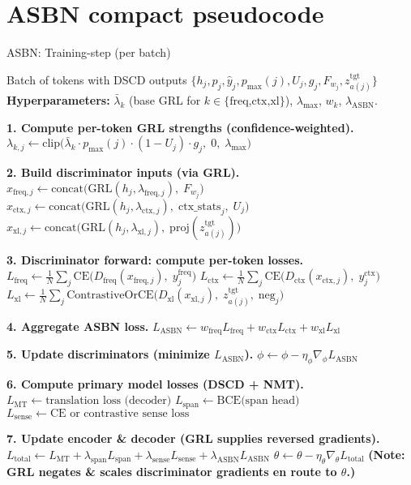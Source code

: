 \documentclass[11pt]{article}
\begin{document}
\section{ASBN compact pseudocode}
\begin{algorithm}[H]
\caption{ASBN: Training-step (per batch)}
\label{alg:asbn}
\begin{algorithmic}[1]
\Require Batch of tokens with DSCD outputs $\{ h_j, p_j, \hat{y}_j, p_{\max}(j), U_j, g_j, F_{w_j}, z^{\mathrm{tgt}}_{a(j)} \}$
\Statex \textbf{Hyperparameters:} $\bar{\lambda}_k$ (base GRL for $k\in\{\text{freq,ctx,xl}\}$), $\lambda_{\max}$, $w_k$, $\lambda_{\text{ASBN}}$.
\vspace{4pt}

\State \textbf{1. Compute per-token GRL strengths (confidence-weighted).}
    \State $\lambda_{k,j} \gets \mathrm{clip}\!\big(\bar{\lambda}_k \cdot p_{\max}(j)\cdot(1-U_j)\cdot g_j,\;0,\;\lambda_{\max}\big)$ 
\EndFor

\State \textbf{2. Build discriminator inputs (via GRL).}
    \State $x_{\text{freq},j} \gets \mathrm{concat}\big(\mathrm{GRL}(h_j,\lambda_{\text{freq},j}),\;F_{w_j}\big)$
    \State $x_{\text{ctx},j}  \gets \mathrm{concat}\big(\mathrm{GRL}(h_j,\lambda_{\text{ctx},j}),\;\text{ctx\_stats}_j,\;U_j\big)$
    \State $x_{\text{xl},j}   \gets \mathrm{concat}\big(\mathrm{GRL}(h_j,\lambda_{\text{xl},j}),\;\mathrm{proj}(z^{\mathrm{tgt}}_{a(j)})\big)$
\EndFor

\State \textbf{3. Discriminator forward: compute per-token losses.}
\State $L_{\text{freq}} \gets \frac{1}{N}\sum_j \mathrm{CE}\big(D_{\text{freq}}(x_{\text{freq},j}),\; y^{\text{freq}}_j\big)$
\State $L_{\text{ctx}}  \gets \frac{1}{N}\sum_j \mathrm{CE}\big(D_{\text{ctx}}(x_{\text{ctx},j}),\; y^{\text{ctx}}_j\big)$
\State $L_{\text{xl}}   \gets \frac{1}{N}\sum_j \mathrm{ContrastiveOrCE}\big(D_{\text{xl}}(x_{\text{xl},j}),\; z^{\mathrm{tgt}}_{a(j)},\; \text{neg}_j\big)$

\State \textbf{4. Aggregate ASBN loss.}
\State $L_{\text{ASBN}} \gets w_{\text{freq}}L_{\text{freq}} + w_{\text{ctx}}L_{\text{ctx}} + w_{\text{xl}}L_{\text{xl}}$

\State \textbf{5. Update discriminators (minimize $L_{\text{ASBN}}$).}
\State $\phi \gets \phi - \eta_\phi \nabla_\phi L_{\text{ASBN}}$

\State \textbf{6. Compute primary model losses (DSCD + NMT).}
\State $L_{\text{MT}} \gets \text{translation loss (decoder)}$
\State $L_{\text{span}} \gets \text{BCE(span head)}$
\State $L_{\text{sense}} \gets \text{CE or contrastive sense loss}$

\State \textbf{7. Update encoder \& decoder (GRL supplies reversed gradients).}
\State $L_{\text{total}} \gets L_{\text{MT}} + \lambda_{\text{span}}L_{\text{span}} + \lambda_{\text{sense}}L_{\text{sense}} + \lambda_{\text{ASBN}}L_{\text{ASBN}}$
\State $\theta \gets \theta - \eta_\theta \nabla_\theta L_{\text{total}}$
\State \textbf{(Note: GRL negates \& scales discriminator gradients en route to $\theta$.)}
\end{algorithmic}
\end{algorithm}
\end{document}
